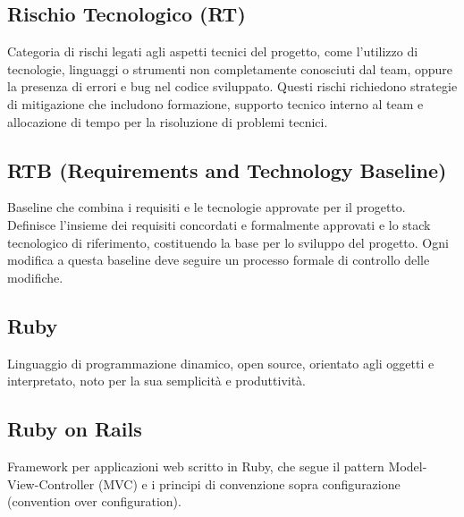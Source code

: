 \documentclass[a4paper,11pt]{article}
\begin{document}
\subsection{Rischio Tecnologico (RT)}
Categoria di rischi legati agli aspetti tecnici del progetto, come l'utilizzo di tecnologie, linguaggi o strumenti non completamente conosciuti dal team, oppure la presenza di errori e bug nel codice sviluppato. Questi rischi richiedono strategie di mitigazione che includono formazione, supporto tecnico interno al team e allocazione di tempo per la risoluzione di problemi tecnici.









\subsection{RTB (Requirements and Technology Baseline)}
Baseline che combina i requisiti e le tecnologie approvate per il progetto. Definisce l'insieme dei requisiti concordati e formalmente approvati e lo stack tecnologico di riferimento, costituendo la base per lo sviluppo del progetto. Ogni modifica a questa baseline deve seguire un processo formale di controllo delle modifiche.









\subsection{Ruby}
Linguaggio di programmazione dinamico, open source, orientato agli oggetti e interpretato, noto per la sua semplicità e produttività.









\subsection{Ruby on Rails}
Framework per applicazioni web scritto in Ruby, che segue il pattern Model-View-Controller (MVC) e i principi di convenzione sopra configurazione (convention over configuration).

\newpage
\end{document}
